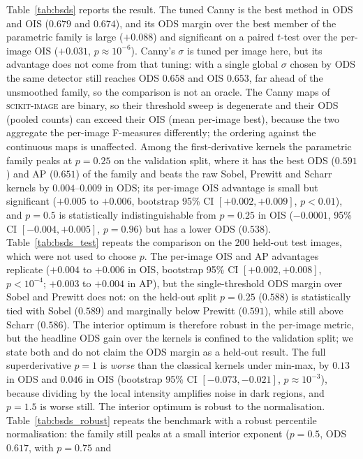 \documentclass[conference]{IEEEtran}
\begin{document}
Table~\ref{tab:bsds} reports the result.  The tuned Canny is the best
method in ODS and OIS ($0.679$ and $0.674$), and its ODS margin over the best
member of the parametric family is large ($+0.088$) and significant on a paired
$t$-test over the per-image OIS ($+0.031$, $p\approx10^{-6}$).  Canny's
$\sigma$ is tuned per image here, but its advantage does not come from that
tuning: with a single global $\sigma$ chosen by ODS the same detector still
reaches ODS $0.658$ and OIS $0.653$, far ahead of the unsmoothed family, so the
comparison is not an oracle.  The Canny maps of \textsc{scikit-image} are binary,
so their threshold sweep is degenerate and their ODS (pooled counts) can exceed
their OIS (mean per-image best), because the two aggregate the per-image
F-measures differently; the ordering against the continuous maps is unaffected.  Among the first-derivative kernels the parametric family peaks
at $p=0.25$ on the validation split, where it has the
best ODS ($0.591$) and AP ($0.651$) of the family and beats the raw Sobel,
Prewitt and Scharr kernels by $0.004$--$0.009$ in ODS; its per-image OIS advantage
is small but significant ($+0.005$ to $+0.006$, bootstrap 95\% CI $[+0.002,+0.009]$,
$p<0.01$), and $p=0.5$ is statistically indistinguishable
from $p=0.25$ in OIS ($-0.0001$, 95\% CI $[-0.004,+0.005]$, $p=0.96$) but has
a lower ODS ($0.538$).
Table~\ref{tab:bsds_test} repeats the comparison on the 200 held-out test
images, which were not used to choose $p$.  The per-image OIS and AP advantages
replicate ($+0.004$ to $+0.006$ in OIS, bootstrap 95\% CI $[+0.002,+0.008]$,
$p<10^{-4}$; $+0.003$ to $+0.004$ in AP), but the single-threshold ODS margin
over Sobel and Prewitt does not: on the held-out split $p=0.25$ ($0.588$) is
statistically tied with Sobel ($0.589$) and marginally below Prewitt ($0.591$),
while still above Scharr ($0.586$).  The interior optimum is therefore robust in the
per-image metric, but the headline ODS gain over the kernels is confined to the
validation split; we state both and do not claim the ODS margin as a held-out result.
The full superderivative $p=1$ is \emph{worse} than the classical kernels under
min-max, by $0.13$ in ODS and $0.046$ in OIS (bootstrap 95\% CI
$[-0.073,-0.021]$, $p\approx10^{-3}$), because dividing by
the local intensity amplifies noise in dark regions, and $p=1.5$ is worse still.
The interior optimum is robust to the normalisation.  Table~\ref{tab:bsds_robust}
repeats the benchmark with a robust percentile normalisation: the family still
peaks at a small interior exponent ($p=0.5$, ODS $0.617$, with $p=0.75$ and
\end{document}
